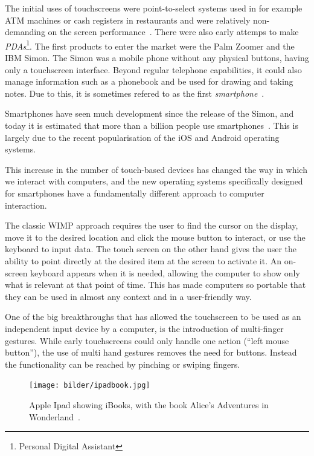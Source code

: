 The initial uses of touchscreens were point-to-select systems used in for example ATM machines or cash registers in restaurants and were relatively non-demanding on the screen performance~\cite{buxton}. There were also early attemps to make \emph{PDAs}\footnote{Personal Digital Assistant}. The first products to enter the market were the Palm Zoomer and the IBM Simon. The Simon was a mobile phone without any physical buttons, having only a touchscreen interface. Beyond regular telephone capabilities, it could also manage information such as a phonebook and be used for drawing and taking notes. Due to this, it is sometimes refered to as the first \emph{smartphone}~\cite{buxton}.

Smartphones have seen much development since the release of the Simon, and today it is estimated that more than a billion people use smartphones~\cite{billion1, billion2}. This is largely due to the recent popularisation of the iOS and Android operating systems.

This increase in the number of touch-based devices has changed the way in which we interact with computers, and the new operating systems specifically designed for smartphones have a fundamentally different approach to computer interaction.

The classic WIMP approach requires the user to find the cursor on the display, move it to the desired location and click the mouse button to interact, or use the keyboard to input data. The touch screen on the other hand gives the user the ability to point directly at the desired item at the screen to activate it. An on-screen keyboard appears when it is needed, allowing the computer to show only what is relevant at that point of time. This has made computers so portable that they can be used in almost any context and in a user-friendly way.

One of the big breakthroughs that has allowed the touchscreen to be used as an independent input device by a computer, is the introduction of multi-finger gestures. While early touchscreens could only handle one action (``left mouse button''), the use of multi hand gestures removes the need for buttons. Instead the functionality can be reached by pinching or swiping fingers.

\begin{figure}[]
\texttt{[image: bilder/ipadbook.jpg]}
\caption{Apple Ipad showing iBooks, with the book Alice's Adventures in Wonderland~\cite{ipadbook}.}
\label{ibooks}
\end{figure}


